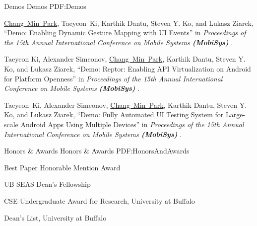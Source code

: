 \documentclass[letterpaper,MMMyyyy,nonstopmode]{simpleresumecv}
\begin{document}
\begin{Body}
\BigGap
\SubSection
{Demos}
{Demos}
{PDF:Demos}

\begingroup
\renewcommand{\MaxNumberedItem}{[88]}

\BigGap
\NumberedItem{[1]}
\underline{Chang~Min~Park}, Taeyeon~Ki, Karthik Dantu, Steven Y. Ko, and Lukasz Ziarek, 
``Demo: Enabling Dynamic Gesture Mapping with UI Events'' in
\textit{Proceedings of the 15th Annual International Conference on Mobile Systems \textbf{(MobiSys)}
}.

\Gap
\NumberedItem{[2]}
Taeyeon Ki, Alexander Simeonov, \underline{Chang~Min~Park}, Karthik Dantu, Steven Y. Ko, 
and Lukasz Ziarek, 
``Demo: Reptor: Enabling API Virtualization on Android for Platform Openness'' in
\textit{Proceedings of the 15th Annual International Conference on Mobile Systems \textbf{(MobiSys)}
}.

\Gap
\NumberedItem{[3]}
Taeyeon~Ki, Alexander Simeonov, \underline{Chang~Min~Park}, Karthik Dantu, 
Steven Y. Ko, and Lukasz Ziarek, 
``Demo: Fully Automated UI Testing System for Large-scale Android Apps Using Multiple 
Devices'' in
\textit{Proceedings of the 15th Annual International Conference on Mobile Systems \textbf{(MobiSys)}
}.



\Section
{Honors \&\newline
Awards}
{Honors \& Awards}
{PDF:HonorsAndAwards}

\BulletItem
Best Paper Honorable Mention Award
\hfill
{}

\Gap
\BulletItem
UB SEAS Dean’s Fellowship
\hfill
{}

\Gap
\BulletItem
CSE Undergraduate Award for Research, University at Buffalo
\hfill
{}

\Gap
\BulletItem
Dean's List, University at Buffalo
\hfill
{}


\end{Body}
\end{document}
